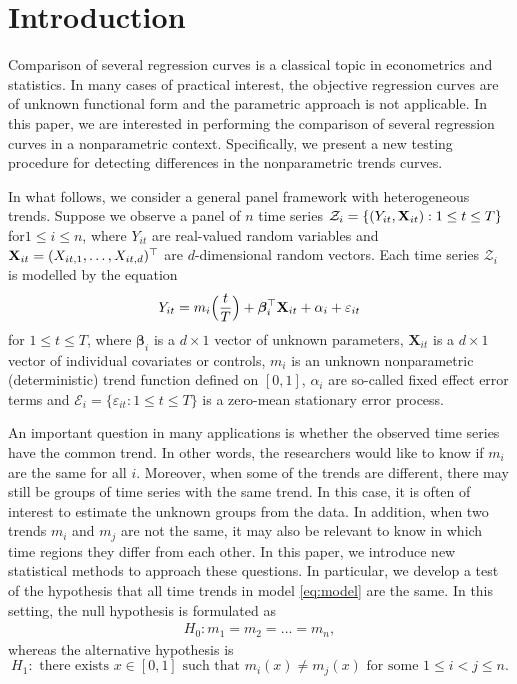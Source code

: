 \documentclass[a4paper,12pt]{article}
\begin{document}
\vspace{-0.25cm}

\allowdisplaybreaks[1]

%

\section{Introduction}\label{sec:intro}

Comparison of several regression curves is a classical topic in econometrics and statistics. In many cases of practical interest, the objective regression curves are of unknown functional form and the parametric approach is not applicable. In this paper, we are interested in performing the comparison of several regression curves in a nonparametric context. Specifically, we present a new testing procedure for detecting differences in the nonparametric trends curves. 

In what follows, we consider a general panel framework with heterogeneous trends. Suppose we observe a panel of $n$ time series $\mathcal{Z}_i = \{ (Y_{it},\mathbf{X}_{it}): 1 \le t \le T \}$ for\linebreak $1 \le i \le n$, where $Y_{it}$ are real-valued random variables and $\mathbf{X}_{it} = (X_{it,1},\ldots,X_{it,d})^\top$ are $d$-dimensional random vectors. Each time series $\mathcal{Z}_i$ is modelled by the equation
\begin{equation}\label{eq:model}
Y_{it} = m_i \Big( \frac{t}{T} \Big) + \bm{\beta}_i^\top \mathbf{X}_{it} + \alpha_i + \varepsilon_{it}
\end{equation}
for $1 \le t \le T$, where $\bm{\beta}_i$ is a $d \times 1$ vector of unknown parameters, $\mathbf{X}_{it}$ is a $d\times 1$ vector of individual covariates or controls, $m_i$ is an unknown nonparametric (deterministic) trend function defined on $[0,1]$, $\alpha_i$ are so-called fixed effect error terms and \linebreak $\mathcal{E}_i = \{ \varepsilon_{it}: 1 \le t \le T \}$ is a zero-mean stationary error process. 


An important question in many applications is whether the observed time series have the common trend. In other words, the researchers would like to know if $m_i$ are the same for all $i$. Moreover, when some of the trends are different, there may still be groups of time series with the same trend. In this case, it is often of interest to estimate the unknown groups from the data. In addition, when two trends $m_i$ and $m_j$ are not the same, it may also be relevant to know in which time regions they differ from each other. In this paper, we introduce new statistical methods to approach these questions. In particular, we develop a test of the hypothesis that all time trends in model \eqref{eq:model} are the same. In this setting, the null hypothesis is formulated as 
\begin{align}\label{eq:null}
H_0: m_1 = m_2 = \ldots = m_n,
\end{align}
whereas the alternative hypothesis is 
$$H_1: \text{ there exists } x\in [0, 1] \text{ such that } m_i (x) \neq m_j(x) \text{ for some } 1\leq i < j \leq n.$$
\end{document}
